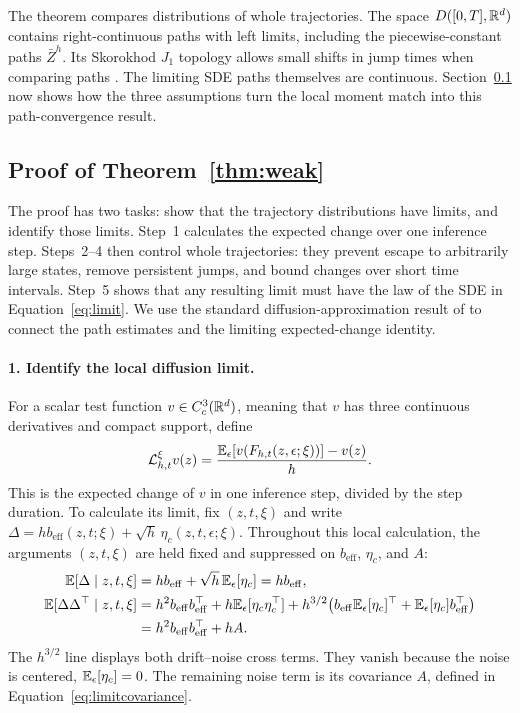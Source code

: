 The theorem compares distributions of whole trajectories. The space $D([0,T],\mathbb R^d)$ contains right-continuous paths with left limits, including the piecewise-constant paths $\bar Z^h$. Its Skorokhod $J_1$ topology allows small shifts in jump times when comparing paths \citep{skorokhod1956limit}. The limiting SDE paths themselves are continuous. Section~\ref{sec:consistency-proof} now shows how the three assumptions turn the local moment match into this path-convergence result.

\subsection{Proof of Theorem~\ref{thm:weak}}\label{sec:consistency-proof}
The proof has two tasks: show that the trajectory distributions have limits, and identify those limits. Step~1 calculates the expected change over one inference step. Steps~2--4 then control whole trajectories: they prevent escape to arbitrarily large states, remove persistent jumps, and bound changes over short time intervals. Step~5 shows that any resulting limit must have the law of the SDE in Equation~\eqref{eq:limit}. We use the standard diffusion-approximation result of \citet{ethier1986markov,kushner2001numerical} to connect the path estimates and the limiting expected-change identity.

\paragraph{1. Identify the local diffusion limit.}
For a scalar test function $v\in C_c^3(\mathbb R^d)$, meaning that $v$ has three continuous derivatives and compact support, define
\begin{equation}\label{eq:discretegenerator}
 \mathcal L_{h,t}^{\xi}v(z)
 =\frac{\mathbb E_\epsilon[v(F_{h,t}(z,\epsilon;\xi))]-v(z)}h.
\end{equation}
This is the expected change of $v$ in one inference step, divided by the step duration. To calculate its limit, fix $(z,t,\xi)$ and write
$\Delta=h b_{\mathrm{eff}}(z,t;\xi)+\sqrt h\,\eta_c(z,t,\epsilon;\xi)$.
Throughout this local calculation, the arguments $(z,t,\xi)$ are held fixed and suppressed on $b_{\mathrm{eff}}$, $\eta_c$, and $A$:
\begin{align}\label{eq:proofmoments}
 \mathbb E[\Delta\mid z,t,\xi]
 &=h b_{\mathrm{eff}}+\sqrt h\,\mathbb E_\epsilon[\eta_c]
 =h b_{\mathrm{eff}},\notag\\
 \mathbb E[\Delta\Delta^\top\mid z,t,\xi]
 &=h^2b_{\mathrm{eff}}b_{\mathrm{eff}}^\top
   +h\mathbb E_\epsilon[\eta_c\eta_c^\top]+h^{3/2}\bigl(
 b_{\mathrm{eff}}\mathbb E_\epsilon[\eta_c]^\top
 +\mathbb E_\epsilon[\eta_c]b_{\mathrm{eff}}^\top\bigr)\notag\\
 &=h^2b_{\mathrm{eff}}b_{\mathrm{eff}}^\top+hA.
\end{align}
The $h^{3/2}$ line displays both drift--noise cross terms. They vanish because the noise is centered, $\mathbb E_\epsilon[\eta_c]=0$. The remaining noise term is its covariance $A$, defined in Equation~\eqref{eq:limitcovariance}.

